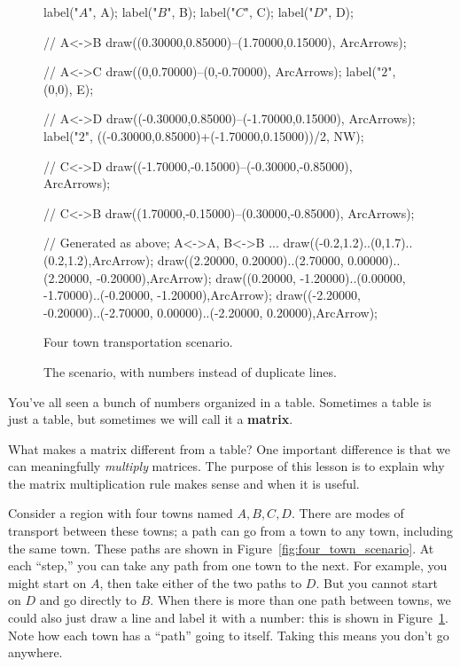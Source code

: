 \documentclass[../textbook.tex]{subfiles}
\begin{document}
\begin{figure}[h]
\begin{center}
\begin{minipage}[b]{0.45\textwidth}
\begin{asy}[width=0.7\textwidth]
				label("$A$", A);
				label("$B$", B);
				label("$C$", C);
				label("$D$", D);

				// A<->B
				draw((0.30000,0.85000)--(1.70000,0.15000), ArcArrows);

				// A<->C
				draw((0,0.70000)--(0,-0.70000), ArcArrows);
				label("$2$", (0,0), E);

				// A<->D
				draw((-0.30000,0.85000)--(-1.70000,0.15000), ArcArrows);
				label("$2$", ((-0.30000,0.85000)+(-1.70000,0.15000))/2, NW);

				// C<->D
				draw((-1.70000,-0.15000)--(-0.30000,-0.85000), ArcArrows);

				// C<->B
				draw((1.70000,-0.15000)--(0.30000,-0.85000), ArcArrows);

				// Generated as above; A<->A, B<->B ...
				draw((-0.2,1.2)..(0,1.7)..(0.2,1.2),ArcArrow);
				draw((2.20000, 0.20000)..(2.70000, 0.00000)..(2.20000, -0.20000),ArcArrow);
				draw((0.20000, -1.20000)..(0.00000, -1.70000)..(-0.20000, -1.20000),ArcArrow);
				draw((-2.20000, -0.20000)..(-2.70000, 0.00000)..(-2.20000, 0.20000),ArcArrow);
			\end{asy}
		\end{minipage}
	\end{center}
	\vspace*{-2\baselineskip}
	\begin{center}
		\begin{minipage}[t]{0.45\textwidth}
			\caption{Four town transportation scenario.}
			\label{fig:four_town_scenario}
		\end{minipage}
		\hfill
		\begin{minipage}[t]{0.45\textwidth}
			\caption{The scenario, with numbers instead of duplicate lines.}
			\label{fig:scenario_with_nums}
		\end{minipage}
	\end{center}
	\vspace*{-2\baselineskip}
\end{figure}

\noindent You've all seen a bunch of numbers organized in a table. Sometimes a table is just a table, but sometimes we will call it a \textbf{matrix}.

What makes a matrix different from a table? One important difference is that we can meaningfully \textit{multiply} matrices. The purpose of this lesson is to explain why the matrix multiplication rule makes sense and when it is useful.

Consider a region with four towns named $A,B,C,D$. There are modes of transport between these towns; a path can go from a town to any town, including the same town. These paths are shown in Figure~\ref{fig:four_town_scenario}. At each ``step,'' you can take any path from one town to the next. For example, you might start on $A$, then take either of the two paths to $D$. But you cannot start on $D$ and go directly to $B$. When there is more than one path between towns, we could also just draw a line and label it with a number: this is shown in Figure~\ref{fig:scenario_with_nums}. Note how each town has a ``path'' going to itself. Taking this means you don't go anywhere.
\end{document}
